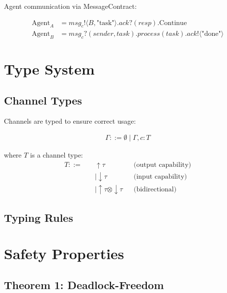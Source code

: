 \documentclass{article}
\begin{document}
Agent communication via MessageContract:

\begin{align*}
\text{Agent}_A &= msg_c!\langle B, \text{"task"} \rangle.ack?(resp). \text{Continue} \\
\text{Agent}_B &= msg_c?(sender, task).process(task).ack!\langle \text{"done"} \rangle
\end{align*}

\section{Type System}

\subsection{Channel Types}

Channels are typed to ensure correct usage:

\begin{align*}
\Gamma ::= \emptyset \mid \Gamma, c:T
\end{align*}

where $T$ is a channel type:
\begin{align*}
T ::=\quad 
  &\uparrow\!\tau && \text{(output capability)} \\
  &| \downarrow\!\tau && \text{(input capability)} \\
  &| \uparrow\!\tau \otimes \downarrow\!\tau && \text{(bidirectional)}
\end{align*}

\subsection{Typing Rules}


\section{Safety Properties}

\subsection{Theorem 1: Deadlock-Freedom}
\end{document}

